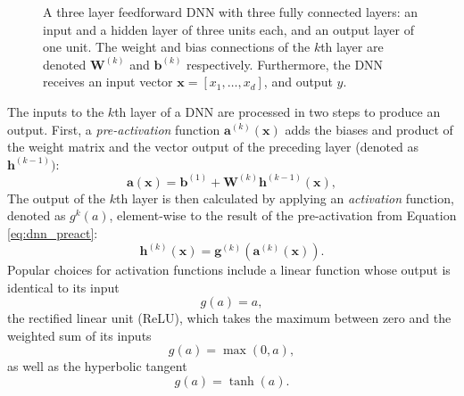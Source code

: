 \begin{figure}[htb!]
    \centering
    
    \caption[A feed forward neural network]{
    A three layer feedforward DNN with three fully connected layers: an input and a hidden layer of three units each, and an output layer of one unit. 
    The weight and bias connections of the $k$th layer are denoted $\mathbf{W}^{(k)}$ and $\mathbf{b}^{(k)}$ respectively.
    Furthermore, the DNN receives an input vector $\bm{x}=[x_1, \ldots ,x_d]$, and output $\hat{y}$.}
    \label{fig:neural_network}
\end{figure}




The inputs to the $k$th layer of a DNN are processed in two steps to produce an output. First, a \emph{pre-activation} function $\bm{a}^{(k)}(\bm{x})$ 
adds the biases and product of the weight matrix and the vector output of the preceding layer (denoted as $\mathbf{h}^{(k-1)})$:
\begin{equation}\label{eq:dnn_preact}
    \bm{a}(\bm{x}) = \mathbf{b}^{(1)} + \mathbf{W}^{(k)} \mathbf{h}^{(k-1)}(\bm{x}),
\end{equation}
The output of the $k$th layer is then calculated by applying an \emph{activation} function, denoted as $g^{k}(a)$, element-wise to the result of the pre-activation from Equation \ref{eq:dnn_preact}:
\begin{equation}\label{eq:dnn_act}
    \mathbf{h}^{(k)}(\bm{x}) = \bm{g}^{(k)}( \bm{a}^{(k)} (\bm{x}) ).
\end{equation}
Popular choices for activation functions include a linear function whose output is identical to its input
\begin{equation}
    g(a) = a,
    \label{eq:linear_act}
\end{equation}
the rectified linear unit (ReLU), which takes the maximum between zero and the weighted sum of its inputs
\begin{equation}
    g(a) = \max(0,a),
    \label{eq:ReLU_act}
\end{equation}
as well as the hyperbolic tangent
\begin{equation}
    g(a) = \tanh(a).
    \label{eq:tanh_act}
\end{equation}


